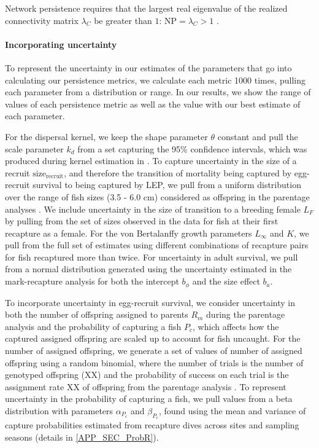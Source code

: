 \documentclass[12pt, oneside]{article}   	%
\begin{document}
Network persistence requires that the largest real eigenvalue of the realized connectivity matrix $\lambda_C$ be greater than $1$: $\text{NP} = \lambda_C > 1$ \citep[e.g.][]{hastings_persistence_2006, white_population_2010, burgess2014beyond}.

\paragraph*{Incorporating uncertainty}
To represent the uncertainty in our estimates of the parameters that go into calculating our persistence metrics, we calculate each metric 1000 times, pulling each parameter from a distribution or range. In our results, we show the range of values of each persistence metric as well as the value with our best estimate of each parameter. 

For the dispersal kernel, we keep the shape parameter $\theta$ constant and pull the scale parameter $k_d$ from a set capturing the 95\% confidence intervals, which was produced during kernel estimation in \cite{catalanoInPrepconnectivity}. To capture uncertainty in the size of a recruit $\text{size}_\text{recruit}$, and therefore the transition of mortality being captured by egg-recruit survival to being captured by LEP, we pull from a uniform distribution over the range of fish sizes (3.5 - 6.0 cm) considered as offspring in the parentage analyses \citep{catalanoInPrepconnectivity}. We include uncertainty in the size of transition to a breeding female $L_F$ by pulling from the set of sizes observed in the data for fish at their first recapture as a female. For the von Bertalanffy growth parameters $L_\infty$ and $K$, we pull from the full set of estimates using different combinations of recapture pairs for fish recaptured more than twice. For uncertainty in adult survival, we pull from a normal distribution generated using the uncertainty estimated in the mark-recapture analysis for both the intercept $b_\phi$ and the size effect $b_a$.

To incorporate uncertainty in egg-recruit survival, we consider uncertainty in both the number of offspring assigned to parents $R_m$ during the parentage analysis and the probability of capturing a fish $P_c$, which affects how the captured assigned offspring are scaled up to account for fish uncaught. For the number of assigned offspring, we generate a set of values of number of assigned offspring using a random binomial, where the number of trials is the number of genotyped offspring (XX) and the probability of success on each trial is the assignment rate XX of offspring from the parentage analysis \citep{catalanoInPrepconnectivity}. To represent uncertainty in the probability of capturing a fish, we pull values from a beta distribution with parameters $\alpha_{P_c}$ and $\beta_{P_c}$, found using the mean and variance of capture probabilities estimated from recapture dives across sites and sampling seasons (details in \ref{APP_SEC_ProbR}). 
\end{document}
